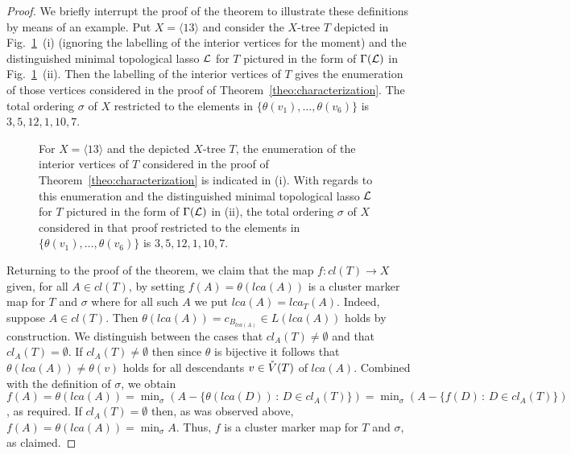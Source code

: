 \begin{proof}
  We briefly interrupt the proof of the theorem to illustrate these
  definitions by means of an example. Put $X=\langle 13\rangle$ and consider
  the $X$-tree $T$ depicted in Fig.~\ref{fig:illustration-main-theorem}~(i)
  (ignoring the labelling of the interior vertices for the moment) and the
  distinguished minimal topological lasso ${\mathcal L}$ for $T$ pictured in the form
  of $\Gamma({\mathcal L})$ in Fig.~\ref{fig:illustration-main-theorem}~(ii). Then the
  labelling of the interior vertices of $T$ gives the enumeration of those
  vertices considered in the proof of Theorem~\ref{theo:characterization}. The
  total ordering $\sigma$ of $X$ restricted to the elements in
  $\{\theta(v_1),\ldots, \theta(v_6)\}$ is $3,5,12,1,10,7$.

  \begin{figure}
    \begin{center}
      
    \end{center}
    \caption{ For $X=\langle 13\rangle$ and the depicted $X$-tree $T$, the
      enumeration of the interior vertices of $T$ considered in the proof of
      Theorem~\ref{theo:characterization} is indicated in (i). With regards to
      this enumeration and the distinguished minimal topological lasso ${\mathcal L}$ for
      $T$ pictured in the form of $\Gamma({\mathcal L})$ in (ii), the total ordering
      $\sigma$ of $X$ considered in that proof restricted to the elements in
      $\{\theta(v_1),\ldots, \theta(v_6)\}$ is $3,5,12,1,10,7$.}
    \label{fig:illustration-main-theorem}
  \end{figure}

  Returning to the proof of the theorem, we claim that the map $f:cl(T)\to X$
  given, for all $A\in cl(T)$, by setting $f(A)=\theta(lca(A))$ is a cluster
  marker map for $T$ and $\sigma$ where for all such $A$ we put
  $lca(A)=lca_T(A)$. Indeed, suppose $A\in cl(T)$.  Then
  $\theta(lca(A))=c_{B_{lca(A)}}\in L(lca(A))$ holds by construction.  We
  distinguish between the cases that $cl_A(T)\not =\emptyset$ and that
  $cl_A(T)=\emptyset$. If $cl_A(T)\not =\emptyset$ then since $\theta$ is
  bijective it follows that $\theta(lca(A))\not=\theta(v)$ holds for all
  descendants $v\in \mathring{V}(T)$ of $lca(A)$.  Combined with the definition of
  $\sigma$, we obtain
  $f(A)=\theta(lca(A))=\min_{\sigma}(A-\{\theta(lca(D))\,:\, D\in cl_A(T)\})=
  \min_{\sigma}(A-\{f(D)\,:\, D\in cl_A(T)\})$, as required.  If
  $cl_A(T)=\emptyset$ then, as was observed above,
  $f(A)=\theta(lca(A))=\min_{\sigma}A$. Thus, $f$ is a cluster marker map for
  $T$ and $\sigma$, as claimed.


\end{proof}
